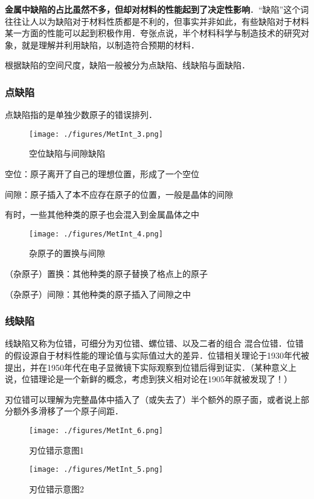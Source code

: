 \textbf{金属中缺陷的占比虽然不多，但却对材料的性能起到了决定性影响}．“缺陷”这个词往往让人以为缺陷对于材料性质都是不利的，但事实并非如此，有些缺陷对于材料某一方面的性能可以起到积极作用．夸张点说，半个材料科学与制造技术的研究对象，就是理解并利用缺陷，以制造符合预期的材料．

根据缺陷的空间尺度，缺陷一般被分为点缺陷、线缺陷与面缺陷．

\subsubsection{点缺陷}
点缺陷指的是单独少数原子的错误排列．
\begin{figure}[ht]
\centering
\texttt{[image: ./figures/MetInt\_3.png]}
\caption{空位缺陷与间隙缺陷} \label{MetInt_fig3}
\end{figure}
空位：原子离开了自己的理想位置，形成了一个空位

间隙：原子插入了本不应存在原子的位置，一般是晶体的间隙

有时，一些其他种类的原子也会混入到金属晶体之中
\begin{figure}[ht]
\centering
\texttt{[image: ./figures/MetInt\_4.png]}
\caption{杂原子的置换与间隙} \label{MetInt_fig4}
\end{figure}

（杂原子）置换：其他种类的原子替换了格点上的原子

（杂原子）间隙：其他种类的原子插入了间隙之中

\subsubsection{线缺陷}
线缺陷又称为位错，可细分为刃位错、螺位错、以及二者的组合 混合位错．位错的假设源自于材料性能的理论值与实际值过大的差异．位错相关理论于1930年代被提出，并在1950年代在电子显微镜下实际观察到位错后得到证实．（某种意义上说，位错理论是一个新鲜的概念，考虑到狭义相对论在1905年就被发现了！）

刃位错可以理解为完整晶体中插入了（或失去了）半个额外的原子面，或者说上部分额外多滑移了一个原子间距．
\begin{figure}[ht]
\centering
\texttt{[image: ./figures/MetInt\_6.png]}
\caption{刃位错示意图1} \label{MetInt_fig6}
\end{figure}
\begin{figure}[ht]
\centering
\texttt{[image: ./figures/MetInt\_5.png]}
\caption{刃位错示意图2} \label{MetInt_fig5}
\end{figure}


